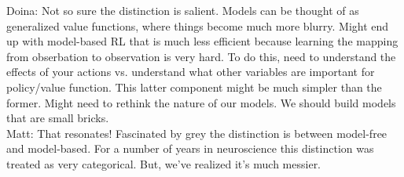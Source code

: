 Doina: Not so sure the distinction is salient. Models can be thought of as generalized value functions, where things become much more blurry. Might end up with model-based RL that is much less efficient because learning the mapping from obserbation to observation is very hard. To do this, need to understand the effects of your actions vs. understand what other variables are important for policy/value function. This latter component might be much simpler than the former. Might need to rethink the nature of our models. We should build models that are small bricks. \\

Matt: That resonates! Fascinated by grey the distinction is between model-free and model-based. For a number of years in neuroscience this distinction was treated as very categorical. But, we've realized it's much messier. 


